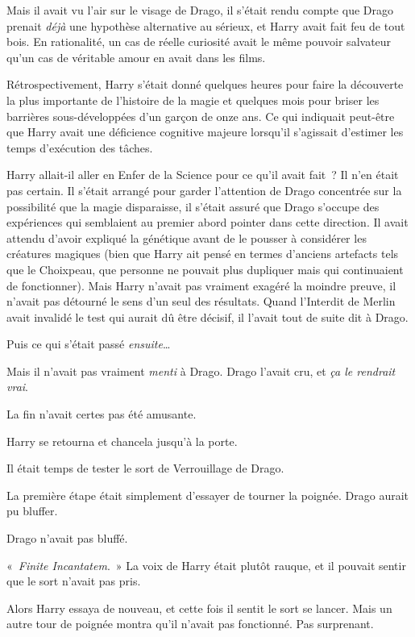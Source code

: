 Mais il avait vu l'air sur le visage de Drago, il s'était rendu compte que Drago prenait \emph{déjà} une hypothèse alternative au sérieux, et Harry avait fait feu de tout bois. En rationalité, un cas de réelle curiosité avait le même pouvoir salvateur qu'un cas de véritable amour en avait dans les films.

Rétrospectivement, Harry s'était donné quelques heures pour faire la découverte la plus importante de l'histoire de la magie et quelques mois pour briser les barrières sous-développées d'un garçon de onze ans. Ce qui indiquait peut-être que Harry avait une déficience cognitive majeure lorsqu'il s'agissait d'estimer les temps d'exécution des tâches.

Harry allait-il aller en Enfer de la Science pour ce qu'il avait fait~? Il n'en était pas certain. Il s'était arrangé pour garder l'attention de Drago concentrée sur la possibilité que la magie disparaisse, il s'était assuré que Drago s'occupe des expériences qui semblaient au premier abord pointer dans cette direction. Il avait attendu d'avoir expliqué la génétique avant de le pousser à considérer les créatures magiques (bien que Harry ait pensé en termes d'anciens artefacts tels que le Choixpeau, que personne ne pouvait plus dupliquer mais qui continuaient de fonctionner). Mais Harry n'avait pas vraiment exagéré la moindre preuve, il n'avait pas détourné le sens d'un seul des résultats. Quand l'Interdit de Merlin avait invalidé le test qui aurait dû être décisif, il l'avait tout de suite dit à Drago.

Puis ce qui s'était passé \emph{ensuite}…

Mais il n'avait pas vraiment \emph{menti} à Drago. Drago l'avait cru, et \emph{ça le rendrait vrai}.

La fin n'avait certes pas été amusante.

Harry se retourna et chancela jusqu'à la porte.

Il était temps de tester le sort de Verrouillage de Drago.

La première étape était simplement d'essayer de tourner la poignée. Drago aurait pu bluffer.

Drago n'avait pas bluffé.

«~\emph{Finite Incantatem}.~» La voix de Harry était plutôt rauque, et il pouvait sentir que le sort n'avait pas pris.

Alors Harry essaya de nouveau, et cette fois il sentit le sort se lancer. Mais un autre tour de poignée montra qu'il n'avait pas fonctionné. Pas surprenant.

